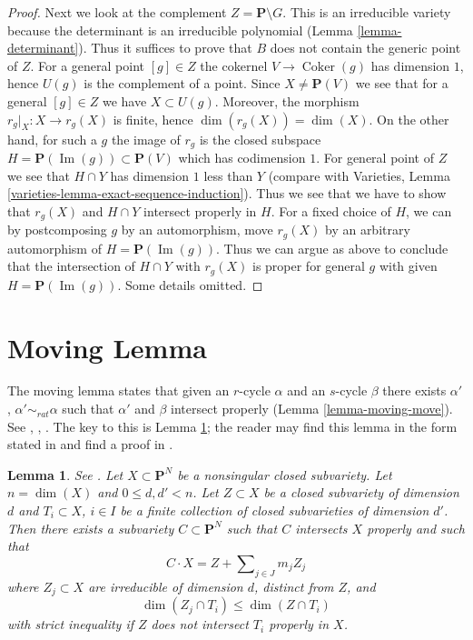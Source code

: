 \documentclass{stacks-project}
\newenvironment{reference}{\comment}{\endcomment}
\theoremstyle{plain}
\newtheorem{lemma}[subsection]{Lemma}
\theoremstyle{definition}
\theoremstyle{remark}
\numberwithin{equation}{subsection}
\def\Im{\mathop{\mathrm{Im}}}
\def\Coker{\mathop{\mathrm{Coker}}}
\begin{document}
\begin{proof}
\medskip\noindent
Next we look at the complement $Z = \mathbf{P} \setminus G$.
This is an irreducible variety because the determinant is an
irreducible polynomial (Lemma \ref{lemma-determinant}).
Thus it suffices to prove that $B$ does not contain the
generic point of $Z$. For a general point $[g] \in Z$
the cokernel $V \to \Coker(g)$ has dimension $1$, hence
$U(g)$ is the complement of a point. Since $X \not = \mathbf{P}(V)$
we see that for a general $[g] \in Z$ we have $X \subset U(g)$.
Moreover, the morphism $r_g|_X : X \to r_g(X)$ is finite, hence
$\dim(r_g(X)) = \dim(X)$.
On the other hand, for such a $g$ the image of $r_g$ is the
closed subspace $H = \mathbf{P}(\Im(g)) \subset \mathbf{P}(V)$
which has codimension $1$.
For general point of $Z$ we see that $H \cap Y$ has dimension $1$
less than $Y$ (compare with
Varieties, Lemma \ref{varieties-lemma-exact-sequence-induction}).
Thus we see that we have to show that $r_g(X)$ and $H \cap Y$
intersect properly in $H$. For a fixed choice of $H$, we can
by postcomposing $g$ by an automorphism, move $r_g(X)$ by
an arbitrary automorphism of $H = \mathbf{P}(\Im(g))$.
Thus we can argue as above to conclude that the intersection
of $H \cap Y$ with $r_g(X)$ is proper for general $g$ with given
$H = \mathbf{P}(\Im(g))$. Some details omitted.
\end{proof}







\section{Moving Lemma}
\label{section-moving-lemma}

\noindent
The moving lemma states that given an $r$-cycle $\alpha$ and an $s$-cycle
$\beta$ there exists $\alpha'$, $\alpha' \sim_{rat} \alpha$ such that
$\alpha'$ and $\beta$ intersect properly (Lemma \ref{lemma-moving-move}).
See \cite{Samuel}, \cite{ChevalleyI}, \cite{ChevalleyII}.
The key to this is Lemma \ref{lemma-moving}; the reader may find
this lemma in the form stated in
\cite[Example 11.4.1]{F} and find a proof in \cite{Roberts}.

\begin{lemma}
\label{lemma-moving}
\begin{reference}
See \cite{Roberts}.
\end{reference}
Let $X \subset \mathbf{P}^N$ be a nonsingular closed subvariety.
Let $n = \dim(X)$ and $0 \leq d, d' < n$. Let $Z \subset X$ be a closed
subvariety of dimension $d$ and $T_i \subset X$, $i \in I$ be a finite
collection of closed subvarieties of dimension $d'$. Then there exists
a subvariety $C \subset \mathbf{P}^N$ such that $C$ intersects $X$
properly and such that
$$
C \cdot X = Z + \sum\nolimits_{j \in J} m_j Z_j
$$
where $Z_j \subset X$ are irreducible of dimension $d$, distinct from $Z$, and
$$
\dim(Z_j \cap T_i) \leq \dim(Z \cap T_i)
$$
with strict inequality if $Z$ does not intersect $T_i$ properly in $X$.
\end{lemma}
\end{document}
